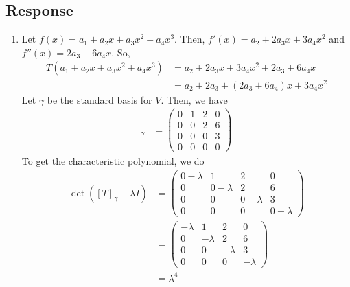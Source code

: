 \documentclass[13pt]{article}
\begin{document}
\subsection*{Response}
\begin{enumerate}[label=(\alph*),leftmargin=*]
\item Let $f(x) = a_1 + a_2x + a_3x^2 + a_4x^3$. Then, $f'(x) = a_2 + 2a_3x + 3a_4x^2$ and $f''(x) =  2a_3 + 6a_4x$. So,
  \begin{align*}
    T(a_1 + a_2x + a_3x^2 + a_4x^3) &= a_2 + 2a_3x + 3a_4x^2 + 2a_3 + 6a_4x \\
                                    &= a_2 + 2a_3 + (2a_3 + 6a_4)x + 3a_4x^2
  \end{align*}
  Let $\gamma$ be the standard basis for $V$. Then, we have
  \begin{align*}
    [T]_\gamma &=
                 \begin{pmatrix}
                   0 & 1 & 2 & 0 \\
                   0 & 0 & 2 & 6 \\
                   0 & 0 & 0 & 3 \\
                   0 & 0 & 0 & 0
                 \end{pmatrix}
  \end{align*}
  To get the characteristic polynomial, we do
  \begin{align*}
    \det([T]_\gamma - \lambda I) &=
                                  \begin{pmatrix}
                                    0 - \lambda & 1 & 2 & 0 \\
                                    0 & 0 - \lambda & 2 & 6 \\
                                    0 & 0 & 0 - \lambda & 3 \\
                                    0 & 0 & 0 & 0 - \lambda
                                  \end{pmatrix} \\
                                &= \begin{pmatrix}
                                     -\lambda & 1 & 2 & 0 \\
                                     0 & -\lambda & 2 & 6 \\
                                     0 & 0 & -\lambda & 3 \\
                                     0 & 0 & 0 & -\lambda
                                   \end{pmatrix} \\
                                &= \lambda^4
  \end{align*}


\end{enumerate}
\end{document}
